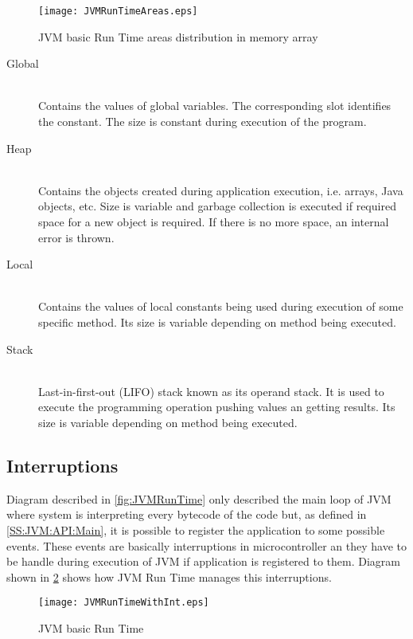 \begin{figure}[H]
\centering
\texttt{[image: JVMRunTimeAreas.eps]}
\caption{JVM basic Run Time areas distribution in memory array}
\label{fig:JVMRunTimeAreas}
\end{figure}

\begin{description}
\item[Global] \hfill \\
Contains the values of global variables. The corresponding slot identifies the constant. The size is constant during execution of the program.
\item[Heap] \hfill \\
Contains the objects created during application execution, i.e. arrays, Java objects, etc. Size is variable and garbage collection is executed if required space for a new object is required. If there is no more space, an internal error is thrown.
\item[Local] \hfill \\
Contains the values of local constants being used during execution of some specific method. Its size is variable depending on method being executed.
\item[Stack] \hfill \\
Last-in-first-out (LIFO) stack known as its operand stack. It is used to execute the programming operation pushing values an getting results. Its size is variable depending on method being executed.
\end{description}

\subsection{Interruptions}\label{SS:JVM:RunTime:Int}
Diagram described in \ref{fig:JVMRunTime} only described the main loop of JVM where system is interpreting every bytecode of the code but, as defined in \ref{SS:JVM:API:Main}, it is possible to register the application to some possible events. These events are basically interruptions in microcontroller an they have to be handle during execution of JVM if application is registered to them. Diagram shown in \ref{fig:JVMRunTimeWithInt} shows how JVM Run Time manages this interruptions.

\begin{figure}[H]
\centering
\texttt{[image: JVMRunTimeWithInt.eps]}
\caption{JVM basic Run Time}
\label{fig:JVMRunTimeWithInt}
\end{figure}

